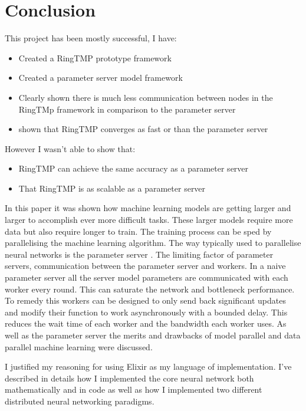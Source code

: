 \section{Conclusion}
This project has been mostly successful, I have:
\begin{itemize}
    \item Created a RingTMP prototype framework
    \item Created a parameter server model framework
    \item Clearly shown there is much less communication between nodes in the
    RingTMp framework in comparison to the parameter server
    \item shown that RingTMP converges as fast or than the parameter server
\end{itemize}

However I wasn't able to show that:
\begin{itemize}
    \item RingTMP can achieve the same accuracy as a parameter server
    \item That RingTMP is as scalable as a parameter server
\end{itemize}
In this paper it was shown how machine learning models are getting larger and
larger to accomplish ever more difficult tasks. These larger models require more
data but also require longer to train. The training process can be sped by
parallelising the machine learning algorithm. \cite{newman2008distributed} The
way typically used to parallelise neural networks is the parameter server
\cite{LI2014ParameterServers}. The limiting factor of parameter servers,
communication between the parameter server and workers. In a naive parameter
server all the server model parameters are communicated with each worker every
round. This can saturate the network and bottleneck performance. To remedy this
workers can be designed to only send back significant updates and modify their
function to work asynchronously with a bounded delay. \cite{li2014communication}
This reduces the wait time of each worker and the bandwidth each worker uses. As
well as the parameter server the merits and drawbacks of model parallel and data
parallel machine learning were discussed.

I justified my reasoning for using Elixir as my language of implementation. I've
described in details how I implemented the core neural network both
mathematically and in code as well as how I implemented two different
distributed neural networking paradigms.


